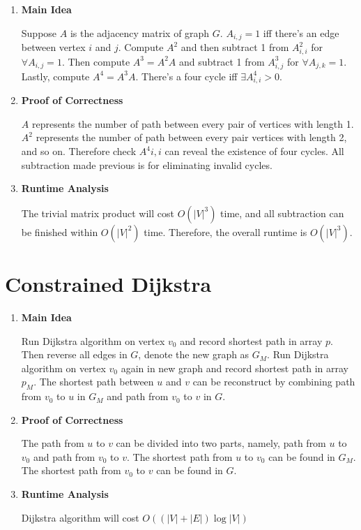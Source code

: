 \documentclass[11pt]{article}
\newenvironment{qparts}{\begin{enumerate}[{(}a{)}]}{\end{enumerate}}
\begin{document}
\begin{qparts}
	\item \textbf{Main Idea}
	
	Suppose $A$ is the adjacency matrix of graph $G$. $A_{i,j} = 1$ iff there's an edge between vertex $i$ and $j$. Compute $A^2$ and then subtract 1 from $A^2_{i, i}$ for $ \forall A_{i, j} = 1$.  Then compute $A^3 = A^2 A$ and subtract 1 from $A^3_{i, j}$ for $\forall A_{j, k} = 1$. Lastly, compute $A^4 = A^3 A$. There's a four cycle iff $\exists A^4_{i, i} > 0$.

	\item \textbf{Proof of Correctness}
	
	$A$ represents the number of path between every pair of vertices with length 1. $A^2$ represents the number of path between every pair vertices with length 2, and so on. Therefore check $A^4{i, i}$ can reveal the existence of four cycles. All subtraction made previous is for eliminating invalid cycles.

	\item \textbf{Runtime Analysis}
	
	The trivial matrix product will cost $O(|V|^3)$ time, and all subtraction can be finished within $O(|V|^2)$ time. Therefore, the overall runtime is $O(|V|^3)$.
	

\end{qparts}

\newpage
\section{Constrained Dijkstra}

\begin{qparts}
	\item \textbf{Main Idea}
	
	Run Dijkstra algorithm on vertex $v_0$ and record shortest path in array $p$. Then reverse all edges in $G$, denote the new graph as $G_M$. Run Dijkstra algorithm on vertex $v_0$ again in new graph and record shortest path in array $p_M$. The shortest path between $u$ and $v$ can be reconstruct by combining path from $v_0$ to $u$ in $G_M$ and path from $v_0$ to $v$ in $G$.
	
	\item \textbf{Proof of Correctness}
	
	The path from $u$ to $v$ can be divided into two parts, namely, path from $u$ to $v_0$ and path from $v_0$ to $v$. The shortest path from $u$ to $v_0$ can be found in $G_M$. The shortest path from $v_0$ to $v$ can be found in $G$. 

	\item \textbf{Runtime Analysis}
	
	Dijkstra algorithm will cost $O((|V| + |E|)\log{|V|})$

\end{qparts}
\newpage
\end{document}

